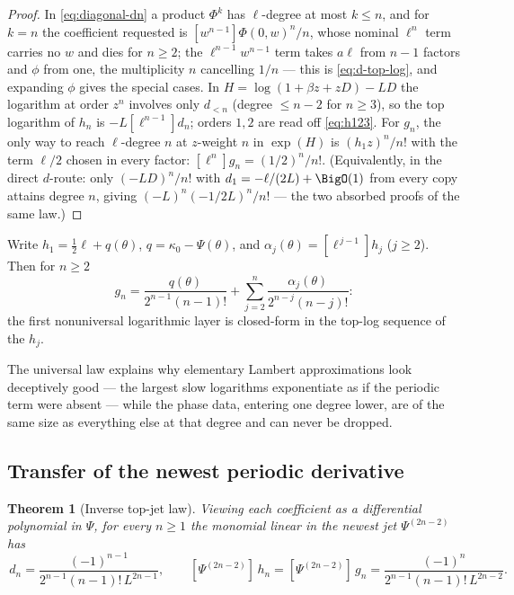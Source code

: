 \documentclass[11pt,oneside]{article}
\numberwithin{equation}{section}
\newtheorem{theorem}{Theorem}[section]
\theoremstyle{definition}
\theoremstyle{remark}
\begin{document}
\begin{proof}
In \eqref{eq:diagonal-dn} a product $\Phi^{k}$ has $\ell$-degree at
most $k\le n$, and for $k=n$ the coefficient requested is
$[w^{n-1}]\Phi(0,w)^{n}/n$, whose nominal $\ell^{n}$ term carries no
$w$ and dies for $n\ge2$; the $\ell^{n-1}w^{n-1}$ term takes
$a\ell$ from $n-1$ factors and $\phi$ from one, the multiplicity $n$
cancelling $1/n$ --- this is \eqref{eq:d-top-log}, and expanding
$\phi$ gives the special cases.  In $H=\log(1+\beta z+zD)-LD$ the
logarithm at order $z^{n}$ involves only $d_{<n}$ (degree
$\le n-2$ for $n\ge3$), so the top logarithm of $h_n$ is
$-L[\ell^{n-1}]d_n$; orders $1,2$ are read off
\eqref{eq:h123}.  For $g_n$, the only way to reach $\ell$-degree $n$
at $z$-weight $n$ in $\exp(H)$ is $(h_1z)^{n}/n!$ with the term
$\ell/2$ chosen in every factor:
$[\ell^{n}]g_n=(1/2)^{n}/n!$.  (Equivalently, in the direct
$d$-route: only $(-LD)^{n}/n!$ with $d_1=-\ell/(2L)+\BigO(1)$ from
every copy attains degree $n$, giving
$(-L)^{n}(-1/2L)^{n}/n!$ --- the two absorbed proofs of the same
law.)
\end{proof}

\begin{corollary}
\label{cor:subleading}
Write $h_1=\tfrac12\ell+q(\theta)$,
$q=\kappa_0-\Psi(\theta)$, and $\alpha_j(\theta)=[\ell^{\,j-1}]h_j$
($j\ge2$).  Then for $n\ge2$
\begin{equation}
 [\ell^{\,n-1}]\,g_n
 =\frac{q(\theta)}{2^{n-1}(n-1)!}
 +\sum_{j=2}^{n}\frac{\alpha_j(\theta)}{2^{n-j}(n-j)!}:
 \label{eq:subleading}
\end{equation}
the first nonuniversal logarithmic layer is closed-form in the
top-log sequence of the $h_j$.
\end{corollary}

The universal law explains why elementary Lambert approximations look
deceptively good --- the largest slow logarithms exponentiate as if
the periodic term were absent --- while the phase data, entering one
degree lower, are of the same size as everything else at that degree
and can never be dropped.

\subsection{Transfer of the newest periodic derivative}

\begin{theorem}[Inverse top-jet law]
\label{thm:inverse-topjet}
Viewing each coefficient as a differential polynomial in $\Psi$, for
every $n\ge1$ the monomial linear in the newest jet
$\Psi^{(2n-2)}$ has
\begin{equation}
 [\Psi^{(2n-2)}]\,d_n
 =\frac{(-1)^{n-1}}{2^{n-1}(n-1)!\,L^{2n-1}},
 \qquad
 [\Psi^{(2n-2)}]\,h_n
 =[\Psi^{(2n-2)}]\,g_n
 =\frac{(-1)^{n}}{2^{n-1}(n-1)!\,L^{2n-2}}.
 \label{eq:inverse-topjet}
\end{equation}
\end{theorem}
\end{document}
